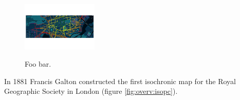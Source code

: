 \begin{figure}[t]
      \hfill
      {\includegraphics[width=0.32\textwidth]{./img/overv-potsd.png}}
      \caption{Foo bar.}
      \label{fig:overv}
    \end{figure}

    In 1881 Francis Galton constructed the first isochronic map for the Royal
    Geographic Society in London (figure \ref{fig:overv:isopc}).






